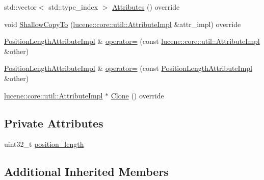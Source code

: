 \begin{DoxyCompactItemize}
\item 
std\+::vector$<$ std\+::type\+\_\+index $>$ \mbox{\hyperlink{classlucene_1_1core_1_1analysis_1_1tokenattributes_1_1PositionLengthAttributeImpl_abb480ef419ad8ee6c27a50e7eda1be29}{Attributes}} () override
\item 
void \mbox{\hyperlink{classlucene_1_1core_1_1analysis_1_1tokenattributes_1_1PositionLengthAttributeImpl_a657ca7b71ea00d5ba609453d0333cafa}{Shallow\+Copy\+To}} (\mbox{\hyperlink{classlucene_1_1core_1_1util_1_1AttributeImpl}{lucene\+::core\+::util\+::\+Attribute\+Impl}} \&attr\+\_\+impl) override
\item 
\mbox{\hyperlink{classlucene_1_1core_1_1analysis_1_1tokenattributes_1_1PositionLengthAttributeImpl}{Position\+Length\+Attribute\+Impl}} \& \mbox{\hyperlink{classlucene_1_1core_1_1analysis_1_1tokenattributes_1_1PositionLengthAttributeImpl_a40bda49e6da62bc1c16e8ef11525d840}{operator=}} (const \mbox{\hyperlink{classlucene_1_1core_1_1util_1_1AttributeImpl}{lucene\+::core\+::util\+::\+Attribute\+Impl}} \&other)
\item 
\mbox{\hyperlink{classlucene_1_1core_1_1analysis_1_1tokenattributes_1_1PositionLengthAttributeImpl}{Position\+Length\+Attribute\+Impl}} \& \mbox{\hyperlink{classlucene_1_1core_1_1analysis_1_1tokenattributes_1_1PositionLengthAttributeImpl_a01cf482ffe511eaa7de8b8c19690f4d7}{operator=}} (const \mbox{\hyperlink{classlucene_1_1core_1_1analysis_1_1tokenattributes_1_1PositionLengthAttributeImpl}{Position\+Length\+Attribute\+Impl}} \&other)
\item 
\mbox{\hyperlink{classlucene_1_1core_1_1util_1_1AttributeImpl}{lucene\+::core\+::util\+::\+Attribute\+Impl}} $\ast$ \mbox{\hyperlink{classlucene_1_1core_1_1analysis_1_1tokenattributes_1_1PositionLengthAttributeImpl_a8880c22ea7f0cc06c2f7ed98900286aa}{Clone}} () override
\end{DoxyCompactItemize}
\subsection*{Private Attributes}
\begin{DoxyCompactItemize}
\item 
uint32\+\_\+t \mbox{\hyperlink{classlucene_1_1core_1_1analysis_1_1tokenattributes_1_1PositionLengthAttributeImpl_a12c90fb7e49f9b4043bfc09d66ef816d}{position\+\_\+length}}
\end{DoxyCompactItemize}
\subsection*{Additional Inherited Members}


